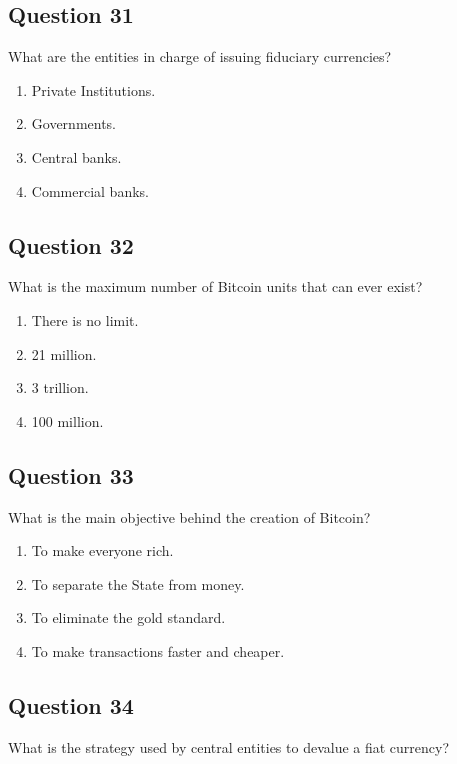 \documentclass[12pt,a4paper]{article}
\begin{document}
\bigskip


\subsection*{Question 31}
What are the entities in charge of issuing fiduciary currencies?

\begin{enumerate}[label=\Alph*., leftmargin=*]
\item Private Institutions.
\item Governments.
\item Central banks.
\item Commercial banks.
\end{enumerate}

\bigskip


\subsection*{Question 32}
What is the maximum number of Bitcoin units that can ever exist?

\begin{enumerate}[label=\Alph*., leftmargin=*]
\item There is no limit.
\item 21 million.
\item 3 trillion.
\item 100 million.
\end{enumerate}

\bigskip


\subsection*{Question 33}
What is the main objective behind the creation of Bitcoin?

\begin{enumerate}[label=\Alph*., leftmargin=*]
\item To make everyone rich.
\item To separate the State from money.
\item To eliminate the gold standard.
\item To make transactions faster and cheaper.
\end{enumerate}

\bigskip


\subsection*{Question 34}
What is the strategy used by central entities to devalue a fiat currency?
\end{document}

